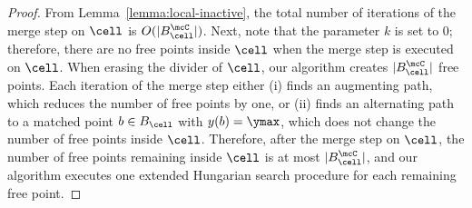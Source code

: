 \matchingIterations*
\begin{proof}
    From Lemma~\ref{lemma:local-inactive}, the total number of iterations of the merge step on $\cell$ is $O(|B_\cell^\mcC|)$.
    Next, note that the parameter $k$ is set to $0$; therefore, there are no free points inside $\cell$ when the merge step is executed on $\cell$. When erasing the divider of $\cell$, our algorithm creates $|B_\cell^\mcC|$ free points. Each iteration of the merge step either (i) finds an augmenting path, which reduces the number of free points by one, or (ii) finds an alternating path to a matched point $b\in B_{\cell}$ with $y(b)=\ymax$, which does not change the number of free points inside $\cell$. Therefore, after the merge step on $\cell$, the number of free points remaining inside $\cell$ is at most $|B_\cell^\mcC|$, and our algorithm executes one extended Hungarian search procedure for each remaining free point.
\end{proof}

